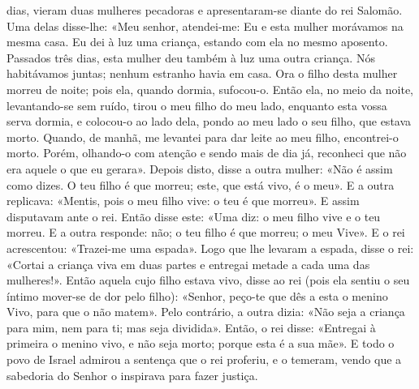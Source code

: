 \begin{paracol}{2}
{ dias, vieram duas mulheres pecadoras e apresentaram-se diante do rei Salomão. Uma delas disse-lhe: «Meu senhor, atendei-me: Eu e esta mulher morávamos na mesma casa. Eu dei à luz uma criança, estando com ela no mesmo aposento. Passados três dias, esta mulher deu também à luz uma outra criança. Nós habitávamos juntas; nenhum estranho havia em casa. Ora o filho desta mulher morreu de noite; pois ela, quando dormia, sufocou-o. Então ela, no meio da noite, levantando-se sem ruído, tirou o meu filho do meu lado, enquanto esta vossa serva dormia, e colocou-o ao lado dela, pondo ao meu lado o seu filho, que estava morto. Quando, de manhã, me levantei para dar leite ao meu filho, encontrei-o morto. Porém, olhando-o com atenção e sendo mais de dia já, reconheci que não era aquele o que eu gerara». Depois disto, disse a outra mulher: «Não é assim como dizes. O teu filho é que morreu; este, que está vivo, é o meu». E a outra replicava: «Mentis, pois o meu filho vive: o teu é que morreu». E assim disputavam ante o rei. Então disse este: «Uma diz: o meu filho vive e o teu morreu. E a outra responde: não; o teu filho é que morreu; o meu Vive». E o rei acrescentou: «Trazei-me uma espada». Logo que lhe levaram a espada, disse o rei: «Cortai a criança viva em duas partes e entregai metade a cada uma das mulheres!». Então aquela cujo filho estava vivo, disse ao rei (pois ela sentiu o seu íntimo mover-se de dor pelo filho): «Senhor, peço-te que dês a esta o menino Vivo, para que o não matem». Pelo contrário, a outra dizia: «Não seja a criança para mim, nem para ti; mas seja dividida». Então, o rei disse: «Entregai à primeira o menino vivo, e não seja morto; porque esta é a sua mãe». E todo o povo de Israel admirou a sentença que o rei proferiu, e o temeram, vendo que a sabedoria do Senhor o inspirava para fazer justiça.
}\end{paracol}

\begin{paracol}{2}\switchcolumn{}\end{paracol}


